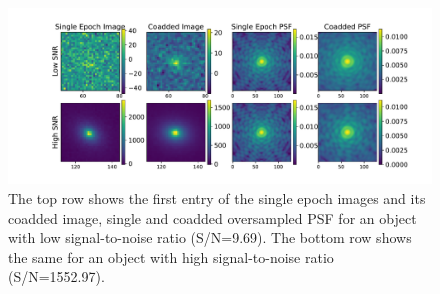 \documentclass[fleqn,usenatbib]{mnras}
\begin{document}
\begin{figure}
	\includegraphics[width=\textwidth]{figure2.pdf}
	\vspace*{-10mm}
    \caption{The top row shows the first entry of the single epoch images and its coadded image, single and coadded oversampled PSF for an object with low signal-to-noise ratio (S/N=9.69). The bottom row shows the same for an object with high signal-to-noise ratio (S/N=1552.97).}
    \label{fig:singlecoadd}
\end{figure}
\end{document}
